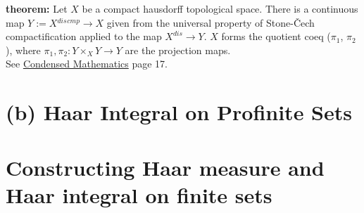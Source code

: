 \documentclass[13pt]{amsart}
\begin{document}
{\bf theorem:} Let $X$ be a compact hausdorff topological space. There is a continuous map $Y := X{}^{dis}{}^{cmp} \rightarrow X$ given from the universal property of Stone-Čech compactification applied to the map $X^{dis} \rightarrow Y$. $X$ forms the quotient coeq ($\pi_1$, $\pi_2$), where $\pi_1, \pi_2 : Y \times_{X} Y \rightarrow Y$ are the projection maps.\\

See \href{}{Condensed Mathematics} page 17.\\


\section{(b) Haar Integral on Profinite Sets}



\section{Constructing Haar measure and Haar integral on finite sets}
\end{document}
